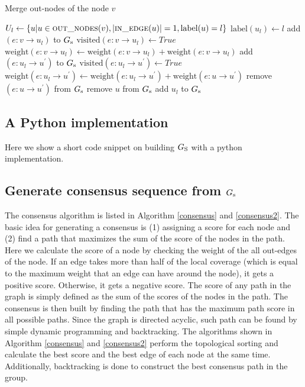 \documentclass[11pt]{article}
\begin{document}
\begin{algorithm}[H]
\caption{Merge out-nodes of the node $v$}          
\label{algGSMergeOut}
\begin{algorithmic}[1]
	\State $U_l \gets \{u|u \in \Call{out\_nodes}{v}, |\Call{in\_edge}{u} | = 1, \textrm{label}(u) = l\}$
	\State $\textrm{label}(u_l) \gets l$
	\State add $(e:v \rightarrow u_l)$ to $G_{\rm s}$
	\State $\textrm{visited}(e:v \rightarrow u_l) \gets True$
		\State $\textrm{weight}(e:v \rightarrow u_l) \gets \textrm{weight}(e:v \rightarrow u_l) + \textrm{weight}(e:v \rightarrow u_l)$
			\State add $(e:u_l \rightarrow u^\prime)$ to $G_{\rm s}$
			\State $\textrm{visited}(e:u_l \rightarrow u^\prime) \gets True$
			\State $\textrm{weight}(e:u_l \rightarrow u^\prime) \gets \textrm{weight}(e:u_l \rightarrow u^\prime) + \textrm{weight}(e:u \rightarrow u^\prime)$
			\State remove $(e:u \rightarrow u^\prime)$ from $G_{\rm s}$ 
		\EndFor
		\State remove $u$ from $G_{\rm s}$ 
	\EndFor
	\State add $u_l$ to $G_{\rm s}$
	\State {} 
\EndFor
\EndFunction
\end{algorithmic}
\end{algorithm}  

\subsection{A Python implementation}

Here we show a short code snippet on building $G_{\rm S}$ with a python implementation.



\subsection{Generate consensus sequence from $G_{\rm s}$}

The consensus algorithm is listed in Algorithm \ref{consensus} and \ref{consensus2}. The basic idea for generating a consensus is (1) assigning a score for each node and (2) find a path that maximizes the sum of the score of the nodes in the path. Here we calculate the score of a node by checking the weight of the all out-edges of the node. If an edge takes more than half of the local coverage (which is equal to the maximum weight that an edge can have around the node), it gets a positive score. Otherwise, it gets a negative score. The score of any path in the graph is simply defined as the sum of the scores of the nodes in the path. The consensus is then built by finding the path that has the maximum path score in all possible paths. Since the graph is directed acyclic, such path can be found by simple dynamic programming and backtracking. The algorithms shown in Algorithm \ref{consensus} and \ref{consensus2} perform the topological sorting and calculate the best score and the best edge of each node at the same time. Additionally, backtracking is done to construct the best consensus path in the group. 
\end{document}
